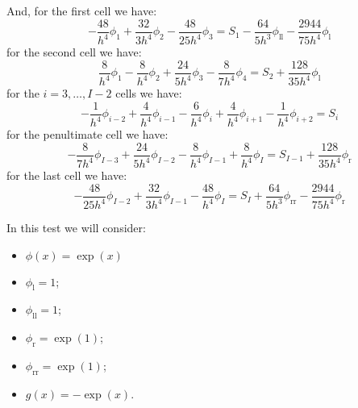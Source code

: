 \documentclass[12pt,a4paper]{article}
\newcommand{\phil}{\phi_\text{l}}
\newcommand{\phill}{\phi_{\text{ll}}}
\newcommand{\phir}{\phi_\text{r}}
\newcommand{\phirr}{\phi_{\text{rr}}}
\begin{document}
And, for the first cell we have:
\[
-\frac{48}{h^4}\phi_1
+\frac{32}{3h^4}\phi_2
-\frac{48}{25h^4}\phi_3
=S_1
-\frac{64}{5h^3}\phill
-\frac{2944}{75h^4}\phil
\]
for the second cell we have:
\[
\frac{8}{h^4}\phi_1
-\frac{8}{h^4}\phi_2
+\frac{24}{5h^4}\phi_3
-\frac{8}{7h^4}\phi_4
=S_2
+\frac{128}{35h^4}\phil
\]
for the $i=3,\ldots,I-2$ cells we have:
\[
-\frac{1}{h^4}\phi_{i-2}
+\frac{4}{h^4}\phi_{i-1}
-\frac{6}{h^4}\phi_{i}
+\frac{4}{h^4}\phi_{i+1}
-\frac{1}{h^4}\phi_{i+2}
=S_i
\]
for the penultimate cell we have:
\[
-\frac{8}{7h^4}\phi_{I-3}
+\frac{24}{5h^4}\phi_{I-2}
-\frac{8}{h^4}\phi_{I-1}
+\frac{8}{h^4}\phi_{I}
=S_{I-1}
+\frac{128}{35h^4}\phir
\]
for the last cell we have:
\[
-\frac{48}{25h^4}\phi_{I-2}
+\frac{32}{3h^4}\phi_{I-1}
-\frac{48}{h^4}\phi_{I}
=S_I
+\frac{64}{5h^3}\phirr
-\frac{2944}{75h^4}\phir
\]

\pagebreak
In this test we will consider:
\begin{itemize}
\item $\phi(x)=\exp(x)$
\item $\phil=1$;
\item $\phill=1$;
\item $\phir=\exp(1)$;
\item $\phirr=\exp(1)$;
\item $g(x)=-\exp(x)$.
\end{itemize}

\end{document}
